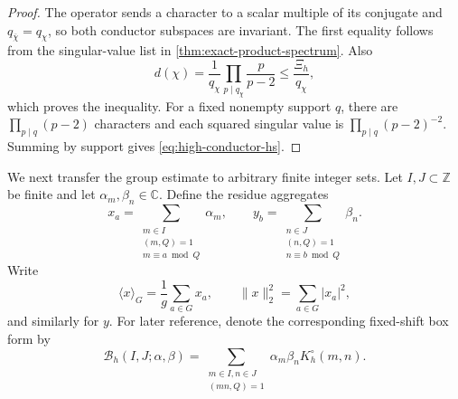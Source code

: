 \documentclass[11pt]{article}
\theoremstyle{definition}
\theoremstyle{remark}
\newcommand{\C}{\mathbb C}
\newcommand{\Z}{\mathbb Z}
\newcommand{\cB}{\mathcal B}
\begin{document}
\begin{proof}
The operator sends a character to a scalar multiple of its conjugate and $q_{\overline\chi}=q_\chi$, so both conductor subspaces are invariant.  The first equality follows from the singular-value list in \cref{thm:exact-product-spectrum}.  Also
\[
 d(\chi)=\frac1{q_\chi}
 \prod_{p\mid q_\chi}\frac{p}{p-2}
 \le\frac{\Xi_h}{q_\chi},
\]
which proves the inequality.  For a fixed nonempty support $q$, there are $\prod_{p\mid q}(p-2)$ characters and each squared singular value is $\prod_{p\mid q}(p-2)^{-2}$.  Summing by support gives \eqref{eq:high-conductor-hs}.
\end{proof}

We next transfer the group estimate to arbitrary finite integer sets.  Let $I,J\subset\Z$ be finite and let $\alpha_m,\beta_n\in\C$.  Define the residue aggregates
\begin{equation}\label{eq:residue-aggregates}
 x_a=\sum_{\substack{m\in I\\(m,Q)=1\\m\equiv a\bmod Q}}\alpha_m,
 \qquad
 y_b=\sum_{\substack{n\in J\\(n,Q)=1\\n\equiv b\bmod Q}}\beta_n.
\end{equation}
Write
\[
 \langle x\rangle_G=\frac1g\sum_{a\in G}x_a,
 \qquad
 \|x\|_2^2=\sum_{a\in G}|x_a|^2,
\]
and similarly for $y$.
For later reference, denote the corresponding fixed-shift box form by
\begin{equation}\label{eq:fixed-shift-box-form}
 \cB_h(I,J;\alpha,\beta)
 =\sum_{\substack{m\in I,n\in J\\(mn,Q)=1}}
 \alpha_m\beta_nK_h^\circ(m,n).
\end{equation}
\end{document}
